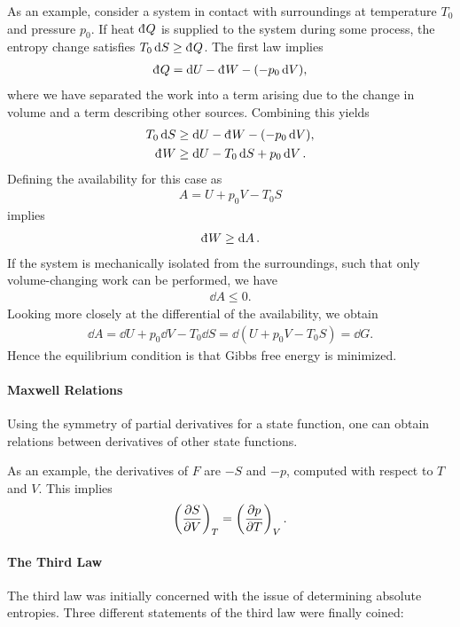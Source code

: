 As an example, consider a system in contact with surroundings at temperature $T_{0}$ and pressure $p_{0}$. If heat $\din{Q}$ is supplied to the system during some process, the entropy change satisfies $T_{0}\dd{S} \geq \din{Q}$. The first law implies
\begin{align*}
	\din{Q} = \dd{U} - \din{W} - (-p_{0}\dd{V}),
\end{align*}
where we have separated the work into a term arising due to the change in volume and a term describing other sources. Combining this yields
\begin{align*}
	T_{0}\dd{S} &\geq \dd{U} - \din{W} - (-p_{0}\dd{V}), \\
	\din{W}     &\geq \dd{U} - T_{0}\dd{S}  + p_{0}\dd{V}.
\end{align*}
Defining the availability for this case as
\begin{align*}
	A = U + p_{0}V - T_{0}S
\end{align*}
implies
\begin{align*}
	\din{W} \geq \dd{A}.
\end{align*}
If the system is mechanically isolated from the surroundings, such that only volume-changing work can be performed, we have
\begin{align*}
	\dd{A} \leq 0.
\end{align*}
Looking more closely at the differential of the availability, we obtain
\begin{align*}
	\dd{A} = \dd{U} + p_{0}\dd{V} - T_{0}\dd{S} = \dd(U + p_{0}V - T_{0}S) = \dd{G}.
\end{align*}
Hence the equilibrium condition is that Gibbs free energy is minimized.



\paragraph{Maxwell Relations}
Using the symmetry of partial derivatives for a state function, one can obtain relations between derivatives of other state functions.

As an example, the derivatives of $F$ are $-S$ and $-p$, computed with respect to $T$ and $V$. This implies
\begin{align*}
	\fix{\pdv{S}{V}}{T} = \fix{\pdv{p}{T}}{V}.
\end{align*}

\paragraph{The Third Law}
The third law was initially concerned with the issue of determining absolute entropies. Three different statements of the third law were finally coined:

